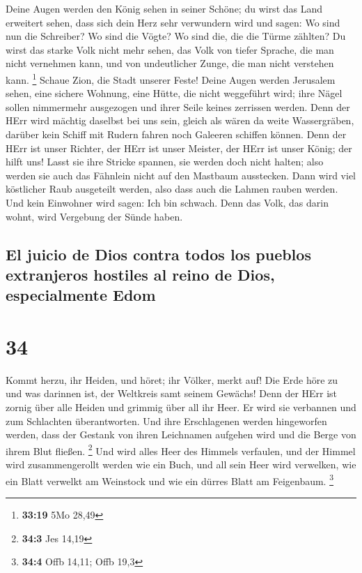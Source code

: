  Deine Augen werden den König sehen in seiner Schöne; du
wirst das Land erweitert sehen,  dass sich dein Herz sehr
verwundern wird und sagen: Wo sind nun die Schreiber? Wo sind die Vögte?
Wo sind die, die die Türme zählten?  Du wirst das starke
Volk nicht mehr sehen, das Volk von tiefer Sprache, die man nicht
vernehmen kann, und von undeutlicher Zunge, die man nicht verstehen
kann. \footnote{\textbf{33:19} 5Mo 28,49}  Schaue Zion,
die Stadt unserer Feste! Deine Augen werden Jerusalem sehen, eine
sichere Wohnung, eine Hütte, die nicht weggeführt wird; ihre Nägel
sollen nimmermehr ausgezogen und ihrer Seile keines zerrissen werden.
 Denn der HErr wird mächtig daselbst bei uns sein, gleich
als wären da weite Wassergräben, darüber kein Schiff mit Rudern fahren
noch Galeeren schiffen können.  Denn der HErr ist unser
Richter, der HErr ist unser Meister, der HErr ist unser König; der hilft
uns!  Lasst sie ihre Stricke spannen, sie werden doch
nicht halten; also werden sie auch das Fähnlein nicht auf den Mastbaum
ausstecken. Dann wird viel köstlicher Raub ausgeteilt werden, also dass
auch die Lahmen rauben werden.  Und kein Einwohner wird
sagen: Ich bin schwach. Denn das Volk, das darin wohnt, wird Vergebung
der Sünde haben.

\hypertarget{el-juicio-de-dios-contra-todos-los-pueblos-extranjeros-hostiles-al-reino-de-dios-especialmente-edom}{%
\subsection{El juicio de Dios contra todos los pueblos extranjeros
hostiles al reino de Dios, especialmente
Edom}\label{el-juicio-de-dios-contra-todos-los-pueblos-extranjeros-hostiles-al-reino-de-dios-especialmente-edom}}

\hypertarget{section-33}{%
\section{34}\label{section-33}}

 Kommt herzu, ihr Heiden, und höret; ihr Völker, merkt
auf! Die Erde höre zu und was darinnen ist, der Weltkreis samt seinem
Gewächs!  Denn der HErr ist zornig über alle Heiden und
grimmig über all ihr Heer. Er wird sie verbannen und zum Schlachten
überantworten.  Und ihre Erschlagenen werden hingeworfen
werden, dass der Gestank von ihren Leichnamen aufgehen wird und die
Berge von ihrem Blut fließen. \footnote{\textbf{34:3} Jes 14,19}
 Und wird alles Heer des Himmels verfaulen, und der Himmel
wird zusammengerollt werden wie ein Buch, und all sein Heer wird
verwelken, wie ein Blatt verwelkt am Weinstock und wie ein dürres Blatt
am Feigenbaum. \footnote{\textbf{34:4} Offb 14,11; Offb 19,3}

